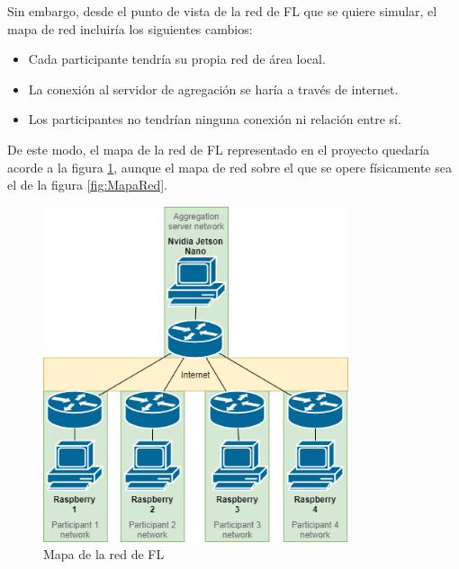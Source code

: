 Sin embargo, desde el punto de vista de la red de FL que se quiere simular, el mapa de red incluiría los siguientes cambios:
\begin{itemize}
    \item Cada participante tendría su propia red de área local.
    \item La conexión al servidor de agregación se haría a través de internet.
    \item Los participantes no tendrían ninguna conexión ni relación entre sí.
\end{itemize}
De este modo, el mapa de la red de FL representado en el proyecto quedaría acorde a la figura \ref{fig:FLMapaRed}, aunque el mapa de red sobre el que se opere físicamente sea el de la figura \ref{fig:MapaRed}.

\begin{figure}[H]
    \centering
    \includegraphics[width=0.8\textwidth]{Figuras/FL_network_map.png}    
    \caption{Mapa de la red de FL} 
    \label{fig:FLMapaRed}
\end{figure}

\pagebreak

